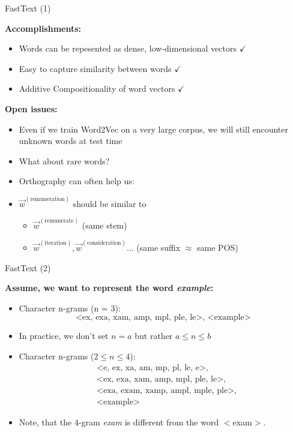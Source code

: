 \begin{vbframe}{FastText (1)}

\vfill

\textbf{Accomplishments:}

\begin{itemize}
	\item Words can be repesented as dense, low-dimensional vectors \hfill $\checkmark$
	\item Easy to capture similarity between words \hfill $\checkmark$
	\item Additive Compositionality of word vectors \hfill $\checkmark$
\end{itemize}

\textbf{Open issues:}

\begin{itemize}
	\item Even if we train Word2Vec on a very large corpus, we will still encounter unknown words at test time
	\item What about rare words? 
	\item Orthography can often help us:
	\item $\vec w^{(\text{remuneration})}$ should be similar to
		\begin{itemize}
			\item $\vec w^{(\text{remunerate})}$ (same stem)
			\item $\vec w^{(\text{iteration})}, \vec w^{(\text{consideration})} \ldots$ (same suffix $\approx$ same POS)
		\end{itemize}
\end{itemize}

\vfill

\end{vbframe}


\begin{vbframe}{FastText (2)}

\vfill

\textbf{Assume, we want to represent the word \textit{example}:}

\begin{itemize}
	\item Character n-grams (n = 3):  
		$$\text{<ex, exa, xam, amp, mpl, ple, le>, <example>}$$
	\item In practice, we don't set $n = a$ but rather $a \leq n \leq b$
	\item Character n-grams ($2 \leq n \leq 4$):
  \begin{align*}
    & \text{<e, ex, xa, am, mp, pl, le, e>,} \\
    & \text{<ex, exa, xam, amp, mpl, ple, le>,} \\
    & \text{<exa, exam, xamp, ampl, mple, ple>,} \\
		& \text{<example>}
  \end{align*}
	\item Note, that the 4-gram \textit{exam} is different from the word $<$exam$>$.
\end{itemize}

\vfill

\end{vbframe}

